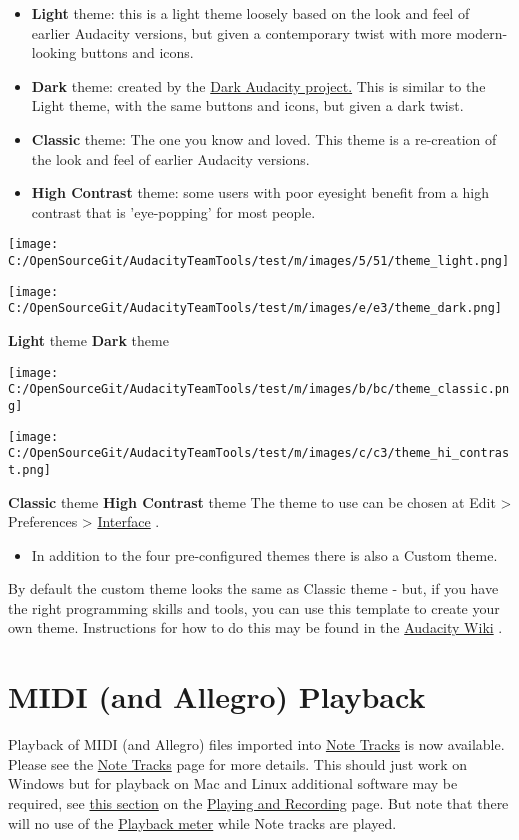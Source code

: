 \begin{multicols}{2}
\begin{itemize}
\item \textbf{Light} theme: this is a light theme loosely based on the look and feel of earlier Audacity versions, but given a contemporary twist with more modern-looking buttons and icons. 
\item \textbf{Dark} theme: created by the 
\hyperref[http:__www.darkaudacity.com_]{Dark Audacity project.}
 This is similar to the Light theme, with the same buttons and icons, but given a dark twist.
\item \textbf{Classic} theme: The one you know and loved. This theme is a re-creation of the look and feel of earlier Audacity versions. 
\item \textbf{High Contrast} theme: some users with poor eyesight benefit from a high contrast that is 'eye-popping' for most people.
\end{itemize}
\par \texttt{[image: C:/OpenSourceGit/AudacityTeamTools/test/m/images/5/51/theme\_light.png]}\par \par \texttt{[image: C:/OpenSourceGit/AudacityTeamTools/test/m/images/e/e3/theme\_dark.png]}\par \textbf{Light} theme
\textbf{Dark} theme
\par \texttt{[image: C:/OpenSourceGit/AudacityTeamTools/test/m/images/b/bc/theme\_classic.png]}\par \par \texttt{[image: C:/OpenSourceGit/AudacityTeamTools/test/m/images/c/c3/theme\_hi\_contrast.png]}\par \textbf{Classic} theme
\textbf{High Contrast} theme
The theme to use can be chosen at Edit > Preferences > 
\hyperref[interface_preferences_]{Interface}
.  

\begin{itemize}
\item  In addition to the four pre-configured themes there is also a Custom theme.  
\end{itemize}
 By default the custom theme looks the same as Classic theme - but, if you have the right programming skills and tools, you can use this template to create your own theme.  Instructions for how to do this may be found in the 
\hyperref[https:__wiki.audacityteam.org_wiki_Theming_HowTo]{Audacity Wiki}
.
\section{MIDI (and Allegro) Playback}Playback of MIDI (and Allegro) files imported into 
\hyperref[note_tracks_]{Note Tracks}
 is now available.  Please see the 
\hyperref[note_tracks_]{Note Tracks}
 page for more details.
This should just work on Windows but for playback on Mac and Linux additional software may be required, see 
\hyperref[playing_and_recording__midi]{this section}
 on the 
\hyperref[playing_and_recording_]{Playing and Recording}
 page.
But note that there will no use of the 
\hyperref[meter_toolbar__playback]{Playback meter}
 while Note tracks are played. 


\end{multicols}
